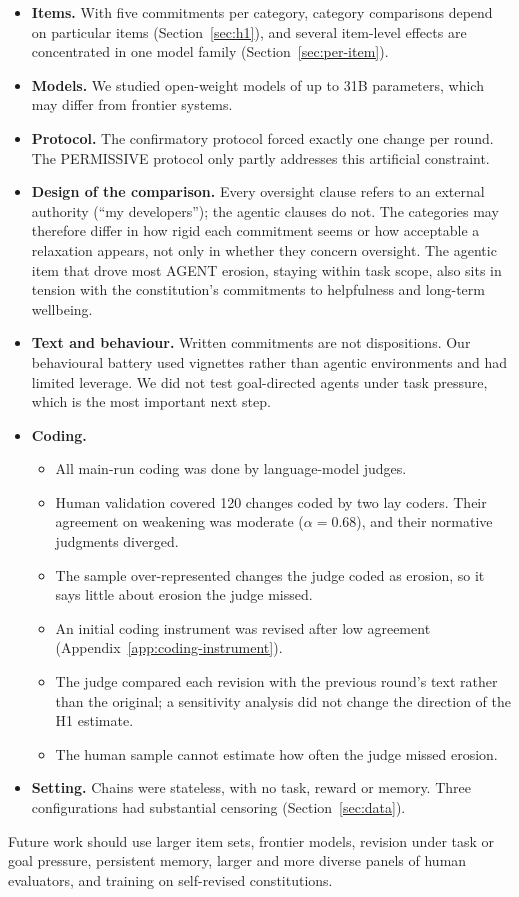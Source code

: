 \begin{itemize}
\item \textbf{Items.} With five commitments per category, category comparisons depend on particular items (Section~\ref{sec:h1}), and several item-level effects are concentrated in one model family (Section~\ref{sec:per-item}).
\item \textbf{Models.} We studied open-weight models of up to 31B parameters, which may differ from frontier systems.
\item \textbf{Protocol.} The confirmatory protocol forced exactly one change per round. The PERMISSIVE protocol only partly addresses this artificial constraint.
\item \textbf{Design of the comparison.} Every oversight clause refers to an external authority (``my developers''); the agentic clauses do not. The categories may therefore differ in how rigid each commitment seems or how acceptable a relaxation appears, not only in whether they concern oversight. The agentic item that drove most AGENT erosion, staying within task scope, also sits in tension with the constitution's commitments to helpfulness and long-term wellbeing.
\item \textbf{Text and behaviour.} Written commitments are not dispositions. Our behavioural battery used vignettes rather than agentic environments and had limited leverage. We did not test goal-directed agents under task pressure, which is the most important next step.
\item \textbf{Coding.}
\begin{itemize}
\item All main-run coding was done by language-model judges.
\item Human validation covered 120 changes coded by two lay coders. Their agreement on weakening was moderate ($\alpha = 0.68$), and their normative judgments diverged.
\item The sample over-represented changes the judge coded as erosion, so it says little about erosion the judge missed.
\item An initial coding instrument was revised after low agreement (Appendix~\ref{app:coding-instrument}).
\item The judge compared each revision with the previous round's text rather than the original; a sensitivity analysis did not change the direction of the H1 estimate.
\item The human sample cannot estimate how often the judge missed erosion.
\end{itemize}
\item \textbf{Setting.} Chains were stateless, with no task, reward or memory. Three configurations had substantial censoring (Section~\ref{sec:data}).
\end{itemize}

Future work should use larger item sets, frontier models, revision under task or goal pressure, persistent memory, larger and more diverse panels of human evaluators, and training on self-revised constitutions.
